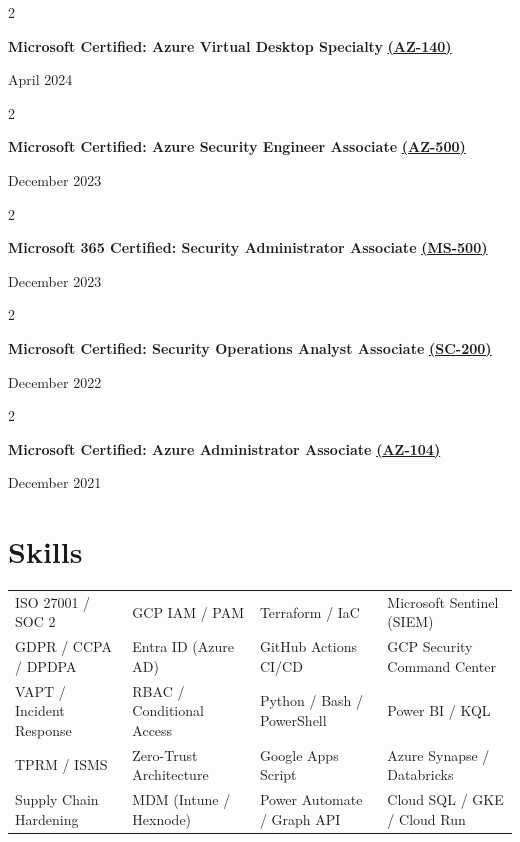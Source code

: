 \documentclass[10pt, letterpaper]{article}
\newenvironment{twocolentry}[2][]{
    \onecolentry
    \def\secondColumn{#2}
    \setcolumnwidth{\fill, 4.5 cm}
    \begin{paracol}{2}
}{
    \switchcolumn \raggedleft \secondColumn
    \end{paracol}
    \endonecolentry
}
\begin{document}
\vspace{0.05 cm}
\begin{twocolentry}{April 2024}
    \textbf{Microsoft Certified: Azure Virtual Desktop Specialty} \href{https://learn.microsoft.com/en-us/users/chinmaydhokmaqsoftware-5822/credentials/ccf1857230b93a53}{\textbf{(AZ-140)}}
\end{twocolentry}

\vspace{0.05 cm}
\begin{twocolentry}{December 2023}
    \textbf{Microsoft Certified: Azure Security Engineer Associate} \href{https://learn.microsoft.com/en-us/users/ChinmayDhokMAQSoftware-5822/credentials/AB3913F87040CE9}{\textbf{(AZ-500)}}
\end{twocolentry}

\vspace{0.05 cm}
\begin{twocolentry}{December 2023}
    \textbf{Microsoft 365 Certified: Security Administrator Associate} \href{https://learn.microsoft.com/en-us/users/chinmaydhokmaqsoftware-5822/credentials/c0ae1a2902b51750}{\textbf{(MS-500)}}
\end{twocolentry}

\vspace{0.05 cm}
\begin{twocolentry}{December 2022}
    \textbf{Microsoft Certified: Security Operations Analyst Associate} \href{https://learn.microsoft.com/en-us/users/ChinmayDhokMAQSoftware-5822/credentials/E22E4108C28D9FF2}{\textbf{(SC-200)}}
\end{twocolentry}

\vspace{0.05 cm}
\begin{twocolentry}{December 2021}
    \textbf{Microsoft Certified: Azure Administrator Associate} \href{https://learn.microsoft.com/en-us/users/chinmaydhokmaqsoftware-5822/credentials/ccf1857230b93a53}{\textbf{(AZ-104)}}
\end{twocolentry}


\section*{Skills}

\vspace{0.2cm}

\noindent\begin{tabularx}{\textwidth}{@{}XXXX@{}}
ISO 27001 / SOC 2         & GCP IAM / PAM              & Terraform / IaC            & Microsoft Sentinel (SIEM) \\
GDPR / CCPA / DPDPA       & Entra ID (Azure AD)        & GitHub Actions CI/CD       & GCP Security Command Center \\
VAPT / Incident Response  & RBAC / Conditional Access   & Python / Bash / PowerShell & Power BI / KQL \\
TPRM / ISMS               & Zero-Trust Architecture     & Google Apps Script         & Azure Synapse / Databricks \\
Supply Chain Hardening    & MDM (Intune / Hexnode)      & Power Automate / Graph API & Cloud SQL / GKE / Cloud Run \\
\end{tabularx}
\end{document}
